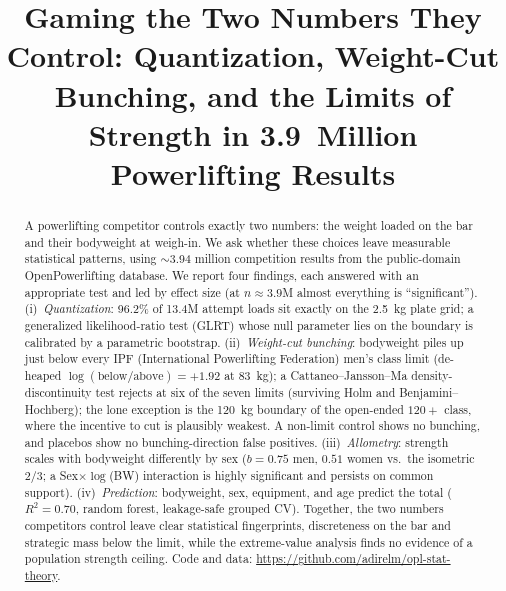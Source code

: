 \documentclass[conference]{IEEEtran}
\begin{document}
\title{Gaming the Two Numbers They Control: Quantization, Weight-Cut Bunching,
and the Limits of Strength in 3.9~Million Powerlifting Results}

\author{
}

\maketitle

\begin{abstract}
A powerlifting competitor controls exactly two numbers: the weight loaded on the
bar and their bodyweight at weigh-in. We ask whether these choices leave
measurable statistical patterns, using $\sim$3.94 million competition results
from the public-domain OpenPowerlifting database. We report four findings, each
answered with an appropriate test and led by effect size (at $n\!\approx\!3.9$M
almost everything is ``significant''). (i)~\emph{Quantization}: 96.2\% of 13.4M attempt
loads sit exactly on the 2.5~kg plate grid; a generalized likelihood-ratio test
(GLRT) whose null parameter lies on the boundary is calibrated by a parametric
bootstrap. (ii)~\emph{Weight-cut bunching}: bodyweight piles up just below every
IPF (International Powerlifting Federation) men's class limit (de-heaped
$\log(\text{below}/\text{above})=+1.92$ at 83~kg); a
Cattaneo--Jansson--Ma density-discontinuity test rejects at six of the seven
limits (surviving Holm and Benjamini--Hochberg); the lone exception is the
120~kg boundary of the open-ended $120{+}$ class, where the incentive to cut is
plausibly weakest. A non-limit
control shows no bunching, and placebos show no bunching-direction false positives. (iii)~\emph{Allometry}: strength scales with
bodyweight differently by sex ($b\!=\!0.75$ men, $0.51$ women vs.\ the isometric
$2/3$; a Sex$\times\log$(BW) interaction is highly significant and persists on
common support). (iv)~\emph{Prediction}: bodyweight, sex, equipment, and age predict the
total ($R^2=0.70$, random forest, leakage-safe grouped CV). Together, the two
numbers competitors control leave clear statistical fingerprints, discreteness on
the bar and strategic mass below the limit, while the extreme-value analysis finds
no evidence of a population strength ceiling. Code and data:
\url{https://github.com/adirelm/opl-stat-theory}.
\end{abstract}
\end{document}
